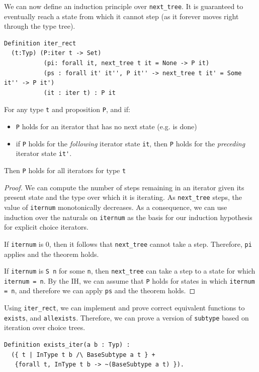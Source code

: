\documentclass[a4paper,english]{lipics-v2019}
\begin{document}
We can now define an induction principle over \verb|next_tree|. It is guaranteed
to eventually reach a state from which it cannot step (as it forever moves right
through the type tree). 

\begin{theorem}
\begin{small}\begin{verbatim}
Definition iter_rect
  (t:Typ) (P:iter t -> Set)
           (pi: forall it, next_tree t it = None -> P it)
           (ps : forall it' it'', P it'' -> next_tree t it' = Some it'' -> P it')
           (it : iter t) : P it  
\end{verbatim}\end{small}

For any type \verb|t| and proposition \verb|P|, and if:
\begin{itemize} 
	\item \verb|P| holds for an iterator that has no next state (e.g. is done)
	\item if \verb|P| holds for the \emph{following} iterator state \verb|it|,
	then \verb|P| holds for the \emph{preceding} iterator state \verb|it'|.
\end{itemize}
Then \verb|P| holds for all iterators for type \verb|t|
\end{theorem}
\begin{proof}
We can compute the number of steps remaining in an iterator given its present state
and the type over which it is iterating. As \verb|next_tree| steps, the value of \verb|iternum| monotonically decreases.
As a consequence, we can use induction over the naturals on \verb|iternum| as the basis
for our induction hypothesis for explicit choice iterators.

If \verb|iternum| is 0, then it follows that \verb|next_tree| cannot take a step. Therefore,
\verb|pi| applies and the theorem holds.

If \verb|iternum| is \verb|S n| for some \verb|n|, then \verb|next_tree| can take a step to a state for which
\verb|iternum = n|. By the IH, we can assume that \verb|P| holds for states in which \verb|iternum = n|, 
and therefore we can apply \verb|ps| and the theorem holds.
\end{proof}

Using \verb|iter_rect|, we can implement and prove correct equivalent functions
to \verb|exists|, and \verb|allexists|. Therefore, we can prove a version of \verb|subtype|
based on iteration over choice trees.
\begin{small}\begin{verbatim}
Definition exists_iter(a b : Typ) : 
  ({ t | InType t b /\ BaseSubtype a t } +
   {forall t, InType t b -> ~(BaseSubtype a t) }).
\end{verbatim}\end{small}
\end{document}
